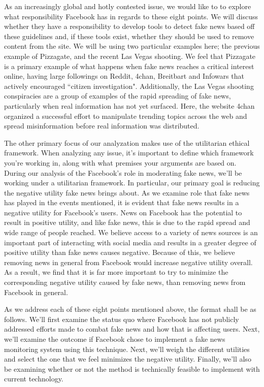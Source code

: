 \documentclass[12pt]{article}
\begin{document}
As an increasingly global and hotly contested issue, we would like to to explore what responsibility Facebook has in regards to these eight points. We will discuss whether they have a responsibility to develop tools to detect fake news based off these guidelines and, if these tools exist, whether they should be used to remove content from the site. We will be using two particular examples here; the previous example of Pizzagate, and the recent Las Vegas shooting. We feel that Pizzagate is a primary example of what happens when fake news reaches a critical interest online, having large followings on Reddit, 4chan, Breitbart and Infowars that actively encouraged ``citizen investigation". Additionally, the Las Vegas shooting conspiracies are a group of examples of the rapid spreading of fake news, particularly when real information has not yet surfaced. Here, the website 4chan organized a successful effort to manipulate trending topics across the web and spread misinformation before real information was distributed.

The other primary focus of our analyzation makes use of the utilitarian ethical framework. When analyzing any issue, it's important to define which framework you're working in, along with what premises your arguments are based on. During our analysis of the Facebook's role in moderating fake news, we'll be working under a utilitarian framework. In particular, our primary goal is reducing the negative utility fake news brings about. As we examine role that fake news has played in the events mentioned, it is evident that fake news results in a negative utility for Facebook's users. News on Facebook has the potential to result in positive utility, and like fake news, this is due to the rapid spread and wide range of people reached. We believe access to a variety of news sources is an important part of interacting with social media and results in a greater degree of positive utility than fake news causes negative. Because of this, we believe removing news in general from Facebook would increase negative utility overall. As a result, we find that it is far more important to try to minimize the corresponding negative utility caused by fake news, than removing news from Facebook in general.

As we address each of these eight points mentioned above, the format shall be as follows. We'll first examine the status quo where Facebook has not publicly addressed efforts made to combat fake news and how that is affecting users. Next, we'll examine the outcome if Facebook chose to implement a fake news monitoring system using this technique. Next, we'll weigh the different utilities and select the one that we feel minimizes the negative utility. Finally, we'll also be examining whether or not the method is technically feasible to implement with current technology.
\end{document}
